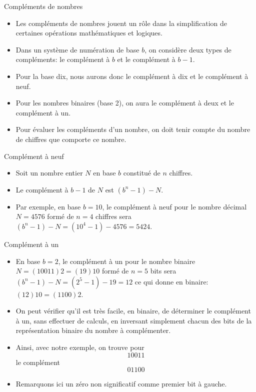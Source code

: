 \documentclass[presentation]{beamer}
\begin{document}
\begin{frame}[label={sec:orgaae5dea}]{Compléments de nombres}
\begin{itemize}
\item Les compléments de nombres jouent un rôle dans la simplification de certaines opérations mathématiques et logiques.

\item Dans un système de numération de base \(b\), on considère deux types de compléments: le complément à \(b\) et le complément à \(b-1\).

\item Pour la base dix, nous aurons donc le complément à dix et le complément à neuf.

\item Pour les nombres binaires (base 2), on aura le complément à deux et le complément à un.

\item Pour évaluer les compléments d'un nombre, on doit tenir compte du nombre de chiffres que comporte ce nombre.
\end{itemize}
\end{frame}

\begin{frame}[label={sec:org70fda31}]{Complément à neuf}
\begin{itemize}
\item Soit un nombre entier \(N\) en base \(b\) constitué de \(n\) chiffres.

\item Le complément à \(b-1\) de \(N\) est \((b^n-1)-N\).

\item Par exemple, en base \(b=10\), le complément à neuf pour le nombre décimal \(N = 4576\) formé de \(n=4\) chiffres sera \((b^n-1)-N = (10^4 -1) - 4576 = 5424\).
\end{itemize}
\end{frame}

\begin{frame}[label={sec:org67be6ee}]{Complément à un}
\begin{itemize}
\item En base \(b=2\), le complément à un pour le nombre binaire \(N = (10011)2 = (19)10\) formé de \(n=5\) bits sera \((b^n-1)-N = (2^5 -1) - 19 = 12\) ce qui donne en binaire: \((12)10 = (1100)2\).

\item On peut vérifier qu'il est très facile, en binaire, de déterminer le complément à un, sans effectuer de calculs, en inversant simplement chacun des bits de la représentation binaire du nombre à complémenter.

\item Ainsi, avec notre exemple, on trouve pour  $$ 10011 $$ le complément $$ 01100 $$

\item Remarquons ici un zéro non significatif comme premier bit à gauche.
\end{itemize}
\end{frame}
\end{document}
